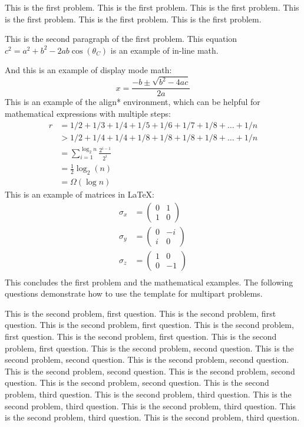 \documentclass{cisXXX} %
\begin{document}
\maketitle
\HWproblem
This is the first problem.
This is the first problem.
This is the first problem.
This is the first problem.
This is the first problem.
This is the first problem.

This is the second paragraph of the first problem. This equation $c^2 = a^2 + b^2 - 2ab \cos(\theta_C)$ is an example of in-line math.

And this is an example of display mode math:
$$x = \frac{-b \pm \sqrt{b^2 - 4ac}}{2a}$$
This is an example of the align* environment, which can be helpful for mathematical expressions with multiple steps:
\begin{align*}
r &= 1/2 + 1/3 + 1/4 + 1/5 + 1/6 + 1/7 + 1/8 + \ldots + 1/n\\
&> 1/2 + 1/4 + 1/4 + 1/8 + 1/8 + 1/8 + 1/8 + \ldots + 1/n\\
&= \sum_{i = 1}^{\log_2 n} \frac{2^{i - 1}}{2^i}\\
&= \frac{1}{2} \log_2 (n)\\ 
&= \Omega(\log n)
\end{align*}
This is an example of matrices in \LaTeX:
\begin{align*}
	\sigma_x &=
		\begin{pmatrix}
		0 & 1 \\
		1 & 0
		\end{pmatrix} \\
	\sigma_y &=
		\begin{pmatrix}
		0 & -i \\
		i & 0
		\end{pmatrix} \\
	\sigma_z &=
		\begin{pmatrix}
		1 & 0 \\
		0 & -1
		\end{pmatrix} \\
\end{align*}
This concludes the first problem and the mathematical examples. The following questions demonstrate how to use the template for multipart problems.

\HWproblem
\HWsubproblem
This is the second problem, first question.
This is the second problem, first question.
This is the second problem, first question.
This is the second problem, first question.
This is the second problem, first question.
This is the second problem, first question.
\HWsubproblem
This is the second problem, second question.
This is the second problem, second question.
This is the second problem, second question.
This is the second problem, second question.
This is the second problem, second question.
This is the second problem, second question.
\HWsubproblem
This is the second problem, third question.
This is the second problem, third question.
This is the second problem, third question.
This is the second problem, third question.
This is the second problem, third question.
This is the second problem, third question.
\end{document}
